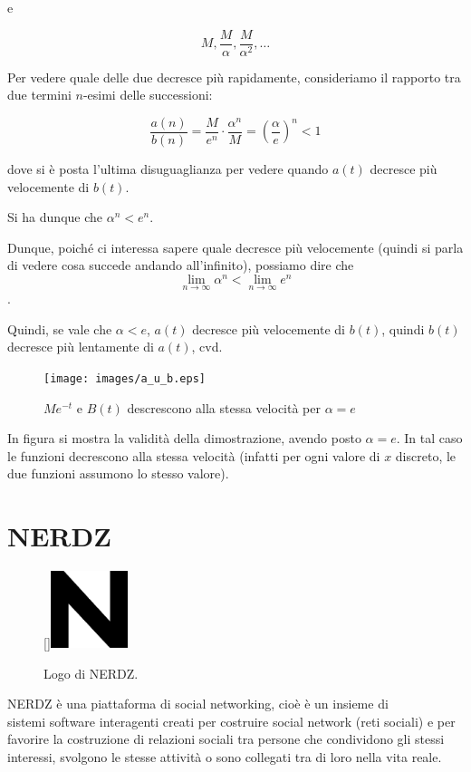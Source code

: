 {e

$$ M, \frac{M}{\alpha}, \frac{M}{\alpha^2},\ldots $$

Per vedere quale delle due decresce più rapidamente, consideriamo il rapporto tra due termini $n$-esimi delle successioni:

$$ \frac{a(n)}{b(n)} = \frac{M}{e^n} \cdot \frac{\alpha^n}{M} = \left( \frac{\alpha}{e} \right) ^n < 1 $$

dove si è posta l'ultima disuguaglianza per vedere quando $a(t)$ decresce più velocemente di $b(t)$.

Si ha dunque che $\alpha^{n} < e^{n}$.

Dunque, poiché ci interessa sapere quale decresce più velocemente (quindi si parla di vedere cosa succede andando all'infinito), possiamo dire che $$\lim\limits_{n \rightarrow \infty} \alpha^{n} < \lim\limits_{n \rightarrow \infty} e^{n}$$.

Quindi, se vale che $\alpha < e$, $a(t)$ decresce più velocemente di $b(t)$, quindi $b(t)$ decresce più lentamente di $a(t)$, cvd.

\begin{figure}[H]
    \begin{center}
        \texttt{[image: images/a\_u\_b.eps]}
        \caption{$Me^{-t}$ e $B(t)$ descrescono alla stessa velocità per $\alpha = e$}
    \end{center}
\end{figure}

In figura si mostra la validità della dimostrazione, avendo posto $\alpha = e$. In tal caso le funzioni decrescono alla stessa velocità (infatti per ogni valore di $x$ discreto, le due funzioni assumono lo stesso valore).

\clearpage
\section{NERDZ}
\begin{figure}
    \setlength\intextsep{0pt}
    \begin{center}
        \raisebox{0pt}[\dimexpr{}\baselineskip\relax]{\includegraphics[width=0.2\textwidth]{images/N.png}}
        \caption{Logo di NERDZ.}
        \vspace*{-1cm}
    \end{center}
\end{figure}
NERDZ è una piattaforma di social networking, cioè è un insieme di\\ sistemi software interagenti creati per costruire social network (reti sociali) e per favorire la costruzione di relazioni sociali tra persone che condividono gli stessi interessi, svolgono le stesse attività o sono collegati tra di loro nella vita reale.

}
